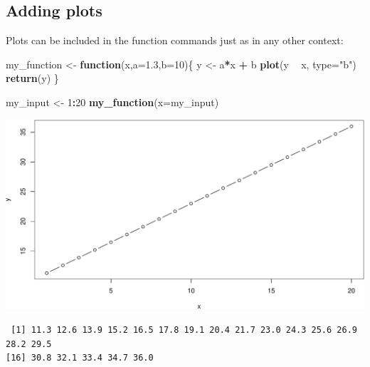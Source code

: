 \documentclass[]{book}
\newenvironment{Shaded}{\begin{snugshade}}{\end{snugshade}}
\newcommand{\ControlFlowTok}[1]{\textcolor[rgb]{0.13,0.29,0.53}{\textbf{#1}}}
\newcommand{\DataTypeTok}[1]{\textcolor[rgb]{0.13,0.29,0.53}{#1}}
\newcommand{\DecValTok}[1]{\textcolor[rgb]{0.00,0.00,0.81}{#1}}
\newcommand{\FloatTok}[1]{\textcolor[rgb]{0.00,0.00,0.81}{#1}}
\newcommand{\KeywordTok}[1]{\textcolor[rgb]{0.13,0.29,0.53}{\textbf{#1}}}
\newcommand{\NormalTok}[1]{#1}
\newcommand{\OperatorTok}[1]{\textcolor[rgb]{0.81,0.36,0.00}{\textbf{#1}}}
\newcommand{\StringTok}[1]{\textcolor[rgb]{0.31,0.60,0.02}{#1}}
\begin{document}
\hypertarget{adding-plots}{%
\subsection*{Adding plots}\label{adding-plots}}

Plots can be included in the function commands just as in any other context:

\begin{Shaded}
\begin{Highlighting}[]
\NormalTok{my_function <-}\StringTok{ }\ControlFlowTok{function}\NormalTok{(x,}\DataTypeTok{a=}\FloatTok{1.3}\NormalTok{,}\DataTypeTok{b=}\DecValTok{10}\NormalTok{)\{}
\NormalTok{  y <-}\StringTok{ }\NormalTok{a}\OperatorTok{*}\NormalTok{x }\OperatorTok{+}\StringTok{ }\NormalTok{b}
  \KeywordTok{plot}\NormalTok{(y }\OperatorTok{~}\StringTok{ }\NormalTok{x, }\DataTypeTok{type=}\StringTok{"b"}\NormalTok{)}
  \KeywordTok{return}\NormalTok{(y)}
\NormalTok{\}}
\end{Highlighting}
\end{Shaded}

\begin{Shaded}
\begin{Highlighting}[]
\NormalTok{my_input <-}\StringTok{ }\DecValTok{1}\OperatorTok{:}\DecValTok{20}
\KeywordTok{my_function}\NormalTok{(}\DataTypeTok{x=}\NormalTok{my_input)}
\end{Highlighting}
\end{Shaded}

\includegraphics{figures/unnamed-chunk-532-1.pdf}

\begin{verbatim}
 [1] 11.3 12.6 13.9 15.2 16.5 17.8 19.1 20.4 21.7 23.0 24.3 25.6 26.9 28.2 29.5
[16] 30.8 32.1 33.4 34.7 36.0
\end{verbatim}
\end{document}
